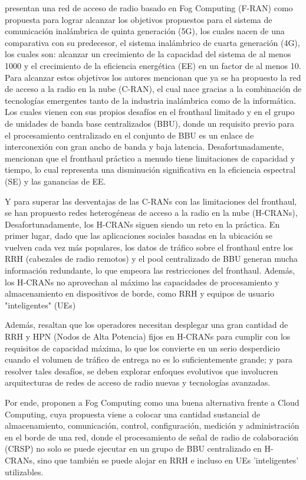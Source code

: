         {\bf\cite{mugen2015}}presentan una red de acceso de radio basado en Fog Computing (F-RAN) como propuesta para lograr alcanzar los objetivos propuestos para el sistema de comunicación inalámbrica de quinta generación (5G), los cuales nacen de una comparativa con su predecesor, el sistema inalámbrico de cuarta generación (4G), los cuales son: alcanzar un crecimiento de la capacidad del sistema de al menos 1000 y el crecimiento de la eficiencia energética (EE) en un factor de al menos 10. Para alcanzar estos objetivos los autores mencionan que ya se ha propuesto la red de acceso a la radio en la nube (C-RAN), el cual nace gracias a la combinación de tecnologías emergentes tanto de la industria inalámbrica como de la informática. Los cuales vienen con sus propios desafíos en el fronthaul limitado y en el grupo de unidades de banda base centralizados (BBU), donde un requisito previo para el procesamiento centralizado en el conjunto de BBU es un enlace de interconexión con gran ancho de banda y baja latencia. Desafortunadamente, mencionan que el fronthaul práctico a menudo tiene limitaciones de capacidad y tiempo, lo cual representa una disminución significativa en la eficiencia espectral (SE) y las ganancias de EE.\par
        Y para superar las desventajas de las C-RANs con las limitaciones del fronthaul, se han propuesto redes heterogéneas de acceso a la radio en la nube (H-CRANs), Desafortunadamente, los H-CRANs siguen siendo un reto en la práctica. En primer lugar, dado que las aplicaciones sociales basadas en la ubicación se vuelven cada vez más populares, los datos de tráfico sobre el fronthaul entre los RRH (cabezales de radio remotos) y el pool centralizado de BBU generan mucha información redundante, lo que empeora las restricciones del fronthaul. Además, los H-CRANs no aprovechan al máximo las capacidades de procesamiento y almacenamiento en dispositivos de borde, como RRH y equipos de usuario "inteligentes" (UEs)\par
        Además, resaltan que los operadores necesitan desplegar una gran cantidad de RRH y HPN (Nodos de Alta Potencia) fijos en H-CRANs para cumplir con los requisitos de capacidad máxima, lo que los convierte en un serio desperdicio cuando el volumen de tráfico de entrega no es lo suficientemente grande; y para resolver tales desafíos, se deben explorar enfoques evolutivos que involucren arquitecturas de redes de acceso de radio nuevas y tecnologías avanzadas.\par
        Por ende, proponen a Fog Computing como una buena alternativa frente a Cloud Computing, cuya propuesta viene a colocar una cantidad sustancial de almacenamiento, comunicación, control, configuración, medición y administración en el borde de una red, donde el procesamiento de señal de radio de colaboración (CRSP) no solo se puede ejecutar en un grupo de BBU centralizado en H-CRANs, sino que también se puede alojar en RRH e incluso en UEs 'inteligentes' utilizables.\par
